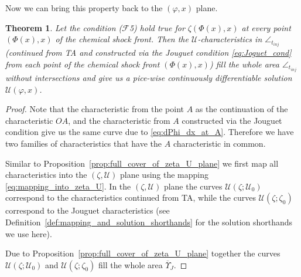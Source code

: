 \documentclass[12pt]{article}
\newtheorem{theorem}{Theorem}
\theoremstyle{definition}
\begin{document}
Now we can bring this property back to the $(\varphi, x)$ plane.

\begin{theorem}
\label{thm1}
Let the condition ($\mathcal F$5) hold true for $\zeta(\Phi(x), x)$ at every point $(\Phi(x), x)$  of the chemical shock front. Then the $\mathcal U$-characteristics in $\angle_{t_{inj}}$ (continued from TA and constructed via the Jouguet condition \eqref{eq:Joguet_cond} from each point of the chemical shock front $(\Phi(x),x)$) fill the whole area $\angle_{t_{inj}}$ without intersections and give us a pice-wise continuously differentiable solution $\mathcal U(\varphi, x)$.
\end{theorem}
\begin{proof}
Note that the characteristic from the point $A$ as the continuation of the characteristic $OA$, and the characteristic from $A$ constructed via the Jouguet condition give us the same curve due to \eqref{eq:dPhi_dx_at_A}. Therefore we have two families of characteristics that have the $A$ characteristic in common.

Similar to Proposition~\ref{prop:full_cover_of_zeta_U_plane} we first map all characteristics into the $(\zeta, \mathcal U)$ plane using the mapping \eqref{eq:mapping_into_zeta_U}. In the $(\zeta, \mathcal U)$ plane the curves $\mathcal U(\zeta; \mathcal U_0)$ correspond to the characteristics continued from TA, while the curves $\mathcal U(\zeta; \zeta_0)$ correspond to the Jouguet characteristics (see Definition~\ref{def:mapping_and_solution_shorthands} for the solution shorthands we use here).

Due to Proposition~\ref{prop:full_cover_of_zeta_U_plane} together the curves $\mathcal U(\zeta; \mathcal U_0)$ and $\mathcal U(\zeta; \zeta_0)$ fill the whole area $\overline{\Upsilon}_J$.


\end{proof}
\end{document}
